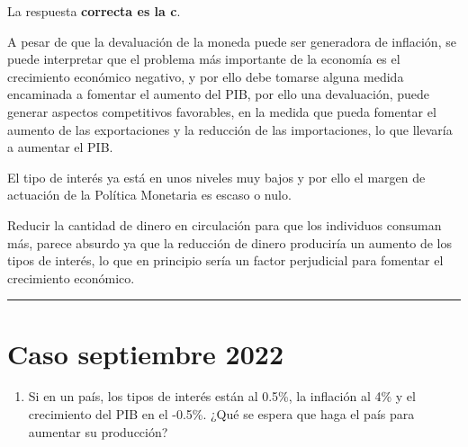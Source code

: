 \documentclass[
  letterpaper,
  DIV=11,
  numbers=noendperiod]{scrreprt}
\providecommand{\tightlist}{%
  \setlength{\itemsep}{0pt}\setlength{\parskip}{0pt}}\usepackage{longtable,booktabs,array}
\begin{document}
\begin{tcolorbox}[enhanced jigsaw, left=2mm, breakable, arc=.35mm, opacityback=0, toprule=.15mm, rightrule=.15mm, leftrule=.75mm, bottomrule=.15mm, colframe=quarto-callout-tip-color-frame, colback=white]
\begin{minipage}[t]{5.5mm}
\textcolor{quarto-callout-tip-color}{\faLightbulb}
\end{minipage}%
\begin{minipage}[t]{\textwidth - 5.5mm}

La respuesta \textbf{correcta es la c}.

A pesar de que la devaluación de la moneda puede ser generadora de
inflación, se puede interpretar que el problema más importante de la
economía es el crecimiento económico negativo, y por ello debe tomarse
alguna medida encaminada a fomentar el aumento del PIB, por ello una
devaluación, puede generar aspectos competitivos favorables, en la
medida que pueda fomentar el aumento de las exportaciones y la reducción
de las importaciones, lo que llevaría a aumentar el PIB.

El tipo de interés ya está en unos niveles muy bajos y por ello el
margen de actuación de la Política Monetaria es escaso o nulo.

Reducir la cantidad de dinero en circulación para que los individuos
consuman más, parece absurdo ya que la reducción de dinero produciría un
aumento de los tipos de interés, lo que en principio sería un factor
perjudicial para fomentar el crecimiento económico.

\end{minipage}%
\end{tcolorbox}

\begin{center}\rule{0.5\linewidth}{0.5pt}\end{center}

\hypertarget{caso-septiembre-2022}{%
\chapter*{Caso septiembre 2022}\label{caso-septiembre-2022}}


\begin{enumerate}
\def\labelenumi{\arabic{enumi}.}
\tightlist
\item
  Si en un país, los tipos de interés están al 0.5\%, la inflación al
  4\% y el crecimiento del PIB en el -0.5\%. ¿Qué se espera que haga el
  país para aumentar su producción?
\end{enumerate}
\end{document}
